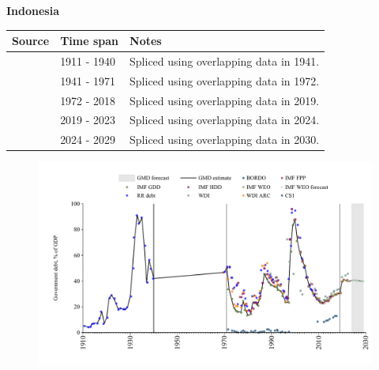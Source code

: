 \documentclass[12pt,a4paper,landscape]{article}
\begin{document}
\begin{adjustbox}{max totalsize={\paperwidth}{\paperheight},center}
\begin{minipage}[t][\textheight][t]{\textwidth}
\vspace*{0.5cm}
{}
\begin{center}
{\Large\bfseries Indonesia}
\end{center}
\vspace{0.5cm}
\begin{table}[H]
\centering
\small
\begin{tabular}{|l|l|l|}
\hline
\textbf{Source} & \textbf{Time span} & \textbf{Notes} \\
\hline
\rowcolor{white}\cite{RR_debt}& 1911 - 1940 &Spliced using overlapping data in 1941.\\
\rowcolor{lightgray}\cite{IMF_FPP}& 1941 - 1971 &Spliced using overlapping data in 1972.\\
\rowcolor{white}\cite{IMF_GDD}& 1972 - 2018 &Spliced using overlapping data in 2019.\\
\rowcolor{lightgray}\cite{IMF_FPP}& 2019 - 2023 &Spliced using overlapping data in 2024.\\
\rowcolor{white}\cite{IMF_WEO_forecast}& 2024 - 2029 &Spliced using overlapping data in 2030.\\
\hline
\end{tabular}
\end{table}
\begin{figure}[H]
\centering
\includegraphics[width=\textwidth,height=0.6\textheight,keepaspectratio]{graphs/IDN_govdebt_GDP.pdf}
\end{figure}
\end{minipage}
\end{adjustbox}
\end{document}
